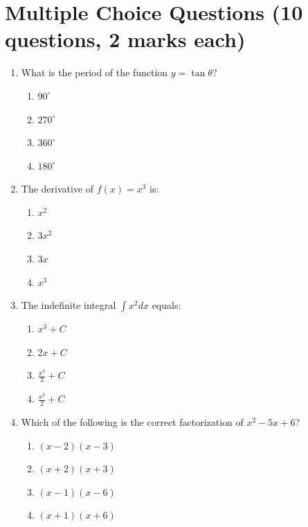 \documentclass{../Templates/sbs-exam}
\begin{document}
\maketitle

\examnotice

\makemarksheet

\examtools

\newpage

\makeatletter


\section*{Multiple Choice Questions (10 questions, 2 marks each)}
\begin{enumerate}
    \item What is the period of the function $y = \tan \theta$?
    \begin{enumerate}
        \item $90^\circ$
        \item $270^\circ$
        \item $360^\circ$
        \item $180^\circ$
    \end{enumerate}
    
    \item The derivative of $f(x) = x^3$ is:
    \begin{enumerate}
        \item $x^2$
        \item $3x^2$
        \item $3x$
        \item $x^3$
    \end{enumerate}
    
    \item The indefinite integral $\int x^2  dx$ equals:
    \begin{enumerate}
        \item $x^3 + C$
        \item $2x + C$
        \item $\frac{x^3}{3} + C$
        \item $\frac{x^2}{2} + C$
    \end{enumerate}
    
    \item Which of the following is the correct factorization of $x^2 - 5x + 6$?
    \begin{enumerate}
        \item $(x-2)(x-3)$
        \item $(x+2)(x+3)$
        \item $(x-1)(x-6)$
        \item $(x+1)(x+6)$
    \end{enumerate}
    

\end{enumerate}
\end{document}
